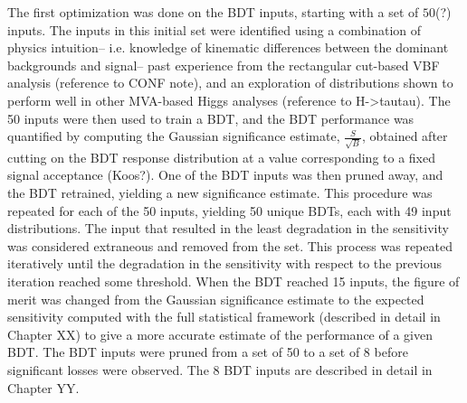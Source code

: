 The first optimization was done on the
BDT inputs, starting with a set of $50$(?) inputs. The inputs in this
initial set were identified using a combination of physics intuition--
i.e. knowledge of kinematic differences between the dominant
backgrounds and signal-- past experience from the rectangular
cut-based VBF analysis (reference to CONF note), and an exploration of
distributions shown to perform well in other MVA-based Higgs
analyses (reference to H->tautau). The 50 inputs were then used to
train a BDT, and the BDT performance was quantified by computing the
Gaussian significance estimate, $\frac{S}{\sqrt{B}}$, obtained after
cutting on the BDT response distribution at a value corresponding to a
fixed signal acceptance (Koos?). One of the BDT inputs was then pruned
away, and the BDT retrained, yielding a new significance
estimate. This procedure was repeated for each of the 50 inputs,
yielding 50 unique BDTs, each with 49 input distributions. The input
that resulted in the least degradation in the sensitivity was
considered extraneous and removed from the set. This process was
repeated iteratively until the degradation in the sensitivity with
respect to the previous iteration reached some threshold. When the BDT
reached 15 inputs, the figure of merit was changed from the Gaussian
significance estimate to the expected sensitivity computed with the
full statistical framework (described in detail in
Chapter XX) to give a more accurate estimate of the
performance of a given BDT. The BDT inputs were pruned from a set of
50 to a set of 8 before significant losses were observed. The 8 BDT
inputs are described in detail in Chapter YY. 

